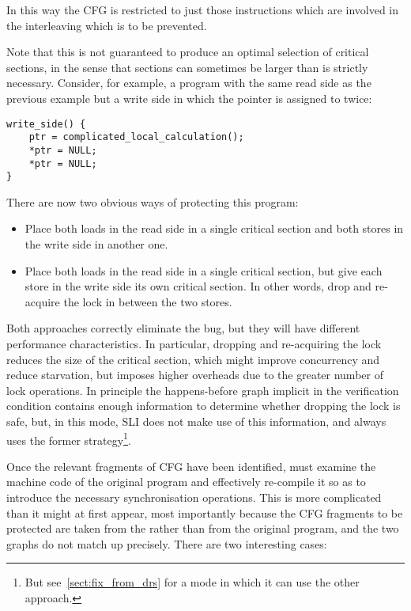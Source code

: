 In this way the CFG is restricted to just those instructions which are
involved in the interleaving which is to be prevented.

Note that this is not guaranteed to produce an optimal selection of
critical sections, in the sense that sections can sometimes be larger
than is strictly necessary.  Consider, for example, a program with the
same read side as the previous example but a write side in which the
pointer is assigned to twice:

\begin{verbatim}
write_side() {
    ptr = complicated_local_calculation();
    *ptr = NULL;
    *ptr = NULL;
}
\end{verbatim}
    
There are now two obvious ways of protecting this program:

\begin{itemize}
\item
  Place both loads in the read side in a single critical section and
  both stores in the write side in another one.
\item
  Place both loads in the read side in a single critical section, but
  give each store in the write side its own critical section.  In
  other words, drop and re-acquire the lock in between the two stores.
\end{itemize}

Both approaches correctly eliminate the bug, but they will have
different performance characteristics.  In particular, dropping and
re-acquiring the lock reduces the size of the critical section, which
might improve concurrency and reduce starvation, but imposes higher
overheads due to the greater number of lock operations.  In principle
the happens-before graph implicit in the verification condition
contains enough information to determine whether dropping the lock is
safe, but, in this mode, SLI does not make use of this information,
and always uses the former strategy\footnote{But
  see~\ref{sect:fix_from_drs} for a mode in which it can use the other
  approach.}.

Once the relevant fragments of CFG have been identified, {\technique}
must examine the machine code of the original program and effectively
re-compile it so as to introduce the necessary synchronisation
operations.  This is more complicated than it might at first appear,
most importantly because the CFG fragments to be protected are taken
from the {\StateMachines} rather than from the original program, and
the two graphs do not match up precisely.  There are two interesting
cases:

